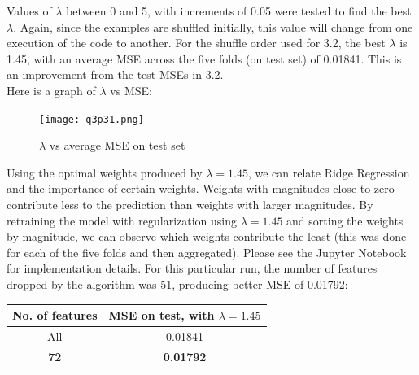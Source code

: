 \documentclass[paper=a4, fontsize=11pt]{scrartcl} %
\numberwithin{equation}{section} %
\numberwithin{figure}{section} %
\numberwithin{table}{section} %
\begin{document}
Values of \(\lambda\) between 0 and 5, with increments of 0.05 were tested to find the best \(\lambda\). Again, since the examples are shuffled initially, this value will change from one execution of the code to another. For the shuffle order used for 3.2, the best \(\lambda\) is 1.45, with an average MSE across the five folds (on test set) of 0.01841. This is an improvement from the test MSEs in 3.2. \\

Here is a graph of \(\lambda\) vs MSE:
\begin{figure}[H]
    \texttt{[image: q3p31.png]}
    \caption{\(\lambda\) vs average MSE on test set}
    \label{fig:q3p31}
\end{figure}

Using the optimal weights produced by \(\lambda = 1.45\), we can relate Ridge Regression and the importance of certain weights. Weights with magnitudes close to zero contribute less to the prediction than weights with larger magnitudes. By retraining the model with regularization using \(\lambda = 1.45\) and sorting the weights by magnitude, we can observe which weights contribute the least (this was done for each of the five folds and then aggregated). Please see the Jupyter Notebook for implementation details. For this particular run, the number of features dropped by the algorithm was 51, producing better MSE of 0.01792:

\begin{center}
\begin{tabular}{ |c|c| } 
    \hline
    \textbf{No. of features} & \textbf{MSE on test, with \(\lambda = 1.45\)} \\
    \hline
    All & 0.01841 \\
    \textbf{72} &  \textbf{0.01792} \\ 
    \hline
\end{tabular}
\end{center}
\end{document}
